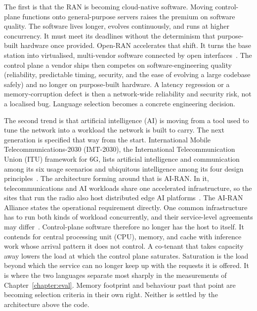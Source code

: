 \documentclass[english,oneside,a4paper,censored,csm,software-track-2020]{HYthesisML}
\begin{document}
The first is that the RAN is becoming cloud-native software. Moving control-plane functions
onto general-purpose servers raises the premium on software quality. The software lives
longer, evolves continuously, and runs at higher concurrency. It must meet its deadlines
without the determinism that purpose-built hardware once provided. Open-RAN accelerates that
shift. It turns the base station into virtualised, multi-vendor software connected by open
interfaces~\cite{polese2023oran}. The control plane a vendor ships then competes on
software-engineering quality (reliability, predictable timing, security, and the ease of
evolving a large codebase safely) and no longer on purpose-built hardware. A latency
regression or a memory-corruption defect is then a network-wide reliability and security risk,
not a localised bug. Language selection becomes a concrete engineering decision.

The second trend is that artificial intelligence (AI) is moving from a tool used to tune the
network into a workload the network is built to carry. The next generation is specified that
way from the start. International Mobile Telecommunications-2030 (IMT-2030), the International
Telecommunication Union (ITU) framework for 6G, lists artificial intelligence and
communication among its six usage scenarios and ubiquitous intelligence among its four design
principles~\cite{itu2023imt2030}. The architecture forming around that is AI-RAN. In it,
telecommunications and AI workloads share one accelerated infrastructure, so the sites that
run the radio also host distributed edge AI platforms~\cite{polese2026airan}. The AI-RAN
Alliance states the operational requirement directly. One common infrastructure has to run
both kinds of workload concurrently, and their service-level agreements may
differ~\cite{airan2026orchestrator}. Control-plane software therefore no longer has the host
to itself. It contends for central processing unit (CPU), memory, and cache with inference
work whose arrival pattern it does not control. A co-tenant that takes capacity away lowers
the load at which the control plane saturates. Saturation is the load beyond which the
service can no longer keep up with the requests it is offered. It is where the two languages
separate most sharply in the measurements of Chapter~\ref{chapter:eval}. Memory footprint and
behaviour past that point are becoming selection criteria in their own right. Neither is
settled by the architecture above the code.
\end{document}
